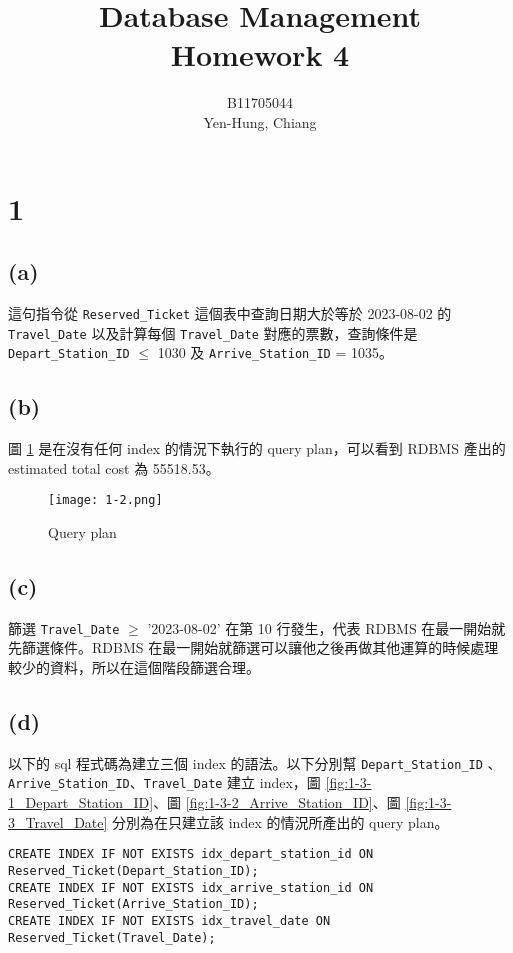 \documentclass{article}
\title{Database Management\\Homework 4}
\author{B11705044 \\ Yen-Hung, Chiang}
\date{}
\begin{document}
\maketitle

\section*{1}
\subsection*{(a)}
這句指令從 \texttt{Reserved\_Ticket} 這個表中查詢日期大於等於 2023-08-02 的 \texttt{Travel\_Date} 以及計算每個 \texttt{Travel\_Date} 對應的票數，查詢條件是 \texttt{Depart\_Station\_ID} $\leq$ 1030 及 \texttt{Arrive\_Station\_ID} = 1035。

\subsection*{(b)}
圖 \ref{fig:1-2} 是在沒有任何 index 的情況下執行的 query plan，可以看到 RDBMS 產出的 estimated total cost 為 55518.53。

\begin{figure}[H]
    \centering
    \texttt{[image: 1-2.png]}
    \caption{Query plan}
    \label{fig:1-2}
\end{figure}


\subsection*{(c)}
篩選 \texttt{Travel\_Date} $\geq$ '2023-08-02' 在第 10 行發生，代表 RDBMS 在最一開始就先篩選條件。RDBMS 在最一開始就篩選可以讓他之後再做其他運算的時候處理較少的資料，所以在這個階段篩選合理。

\subsection*{(d)}
以下的 sql 程式碼為建立三個 index 的語法。以下分別幫 \texttt{Depart\_Station\_ID} 、\texttt{Arrive\_Station\_ID}、\texttt{Travel\_Date} 建立 index，圖 \ref{fig:1-3-1_Depart_Station_ID}、圖 \ref{fig:1-3-2_Arrive_Station_ID}、圖 \ref{fig:1-3-3_Travel_Date}  分別為在只建立該 index 的情況所產出的 query plan。


\begin{verbatim}
CREATE INDEX IF NOT EXISTS idx_depart_station_id ON Reserved_Ticket(Depart_Station_ID);
CREATE INDEX IF NOT EXISTS idx_arrive_station_id ON Reserved_Ticket(Arrive_Station_ID);
CREATE INDEX IF NOT EXISTS idx_travel_date ON Reserved_Ticket(Travel_Date);
\end{verbatim}
\end{document}
